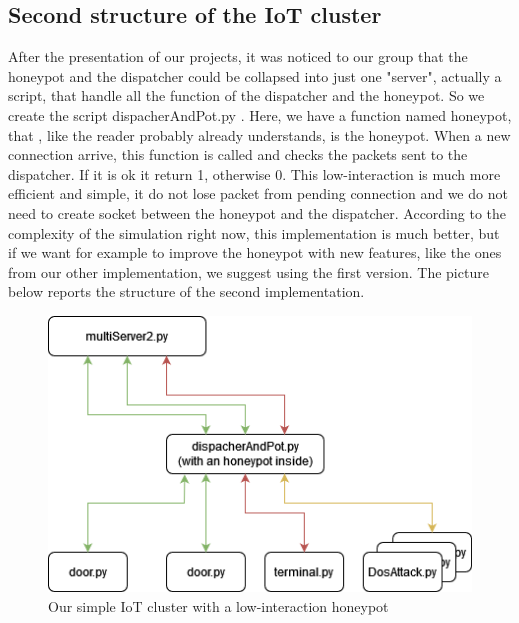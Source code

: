 \subsection{ Second structure of the IoT cluster}
After the presentation of our projects, it was noticed to our group that the honeypot and the dispatcher could be collapsed into just one "server", actually a script, that handle all the function of the dispatcher and the honeypot. So we create the script dispacherAndPot.py . Here, we have a function named honeypot, that , like the reader probably already understands, is the honeypot. When a new connection arrive, this function is called and checks the packets sent to the dispatcher. If it is ok it return 1, otherwise 0. This low-interaction is much more efficient and simple, it do not lose packet from pending connection and we do not need to create socket between the honeypot and the dispatcher. According to the complexity of the simulation right now, this implementation is much better, but if we want for example to improve the honeypot with new features, like the ones from our other implementation, we suggest using the first version. The picture below reports the structure of the second implementation.
\begin{figure}[h!]
  \centering
  \includegraphics[width = 12cm]{images/lowInterationHoneypot.drawio.png}
  \caption{Our simple IoT cluster with a low-interaction honeypot}
  \label{fig:DosImpl2}
\end{figure}
\FloatBarrier
\noindent











